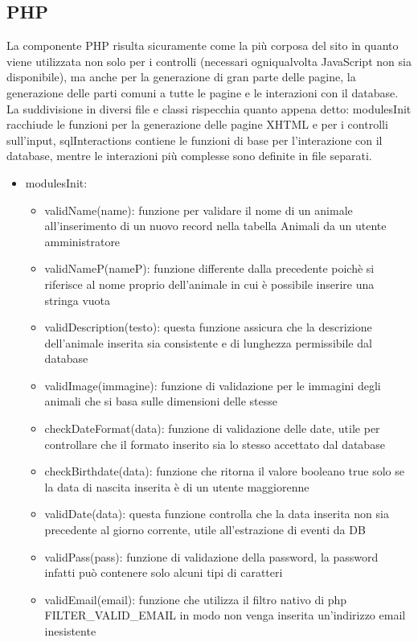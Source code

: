 \subsection{PHP}
La componente PHP risulta sicuramente come la più corposa del sito in quanto viene utilizzata non solo per i controlli (necessari ogniqualvolta JavaScript non sia disponibile), ma anche per la generazione di gran parte delle pagine, la generazione delle parti comuni a tutte le pagine e le interazioni con il database. La suddivisione in diversi file e classi rispecchia quanto appena detto: modulesInit racchiude le funzioni per la generazione delle pagine XHTML e per i controlli sull'input, sqlInteractions contiene le funzioni di base per l'interazione con il database, mentre le interazioni più complesse sono definite in file separati.
\begin{itemize}
\item modulesInit:
\begin{itemize}
\item validName(name): funzione per validare il nome di un animale all'inserimento di un nuovo record nella tabella Animali da un utente amministratore
\item validNameP(nameP): funzione differente dalla precedente poichè si riferisce al nome proprio dell'animale in cui è possibile inserire una stringa vuota
\item validDescription(testo): questa funzione assicura che la descrizione dell'animale inserita sia consistente e di lunghezza permissibile dal database
\item validImage(immagine): funzione di validazione per le immagini degli animali che si basa sulle dimensioni delle stesse
\item checkDateFormat(data): funzione di validazione delle date, utile per controllare che il formato inserito sia lo stesso accettato dal database
\item checkBirthdate(data): funzione che ritorna il valore booleano true solo se la data di nascita inserita è di un utente maggiorenne
\item validDate(data): questa funzione controlla che la data inserita non sia precedente al giorno corrente, utile all'estrazione di eventi da DB
\item validPass(pass): funzione di validazione della password, la password infatti può contenere solo alcuni tipi di caratteri
\item validEmail(email): funzione che utilizza il filtro nativo di php FILTER_VALID_EMAIL in modo non venga inserita un'indirizzo email inesistente

\end{itemize}
\end{itemize}
